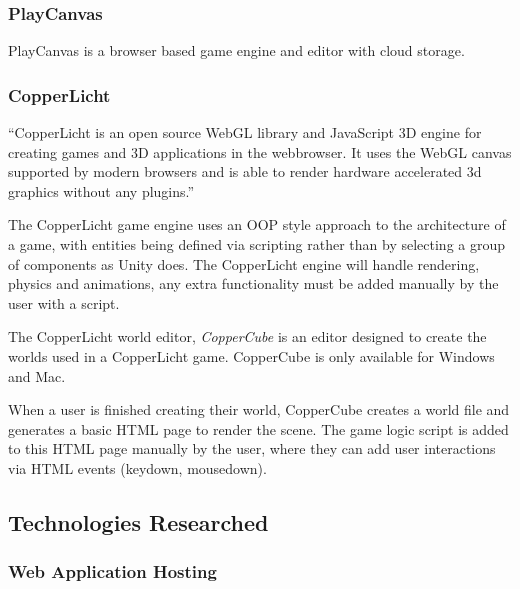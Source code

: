 \documentclass[a4paper, 12pt]{article}
\begin{document}

\subsubsection{PlayCanvas}
PlayCanvas is a browser based game engine and editor with cloud storage. 


\subsubsection{CopperLicht}
``CopperLicht is an open source WebGL library and JavaScript 3D engine for creating games and 3D applications in the webbrowser. It uses the WebGL canvas supported by modern browsers and is able to render hardware accelerated 3d graphics without any plugins.''


The CopperLicht game engine uses an OOP style approach to the architecture of a game, with entities being defined via scripting rather than by selecting a group of components as Unity does. The CopperLicht engine will handle rendering, physics and animations, any extra functionality must be added manually by the user with a script.


The CopperLicht world editor, \emph{CopperCube} is an editor designed to create the worlds used in a CopperLicht game. CopperCube is only available for Windows and Mac.


When a user is finished creating their world, CopperCube creates a world file and generates a basic HTML page to render the scene. The game logic script is added to this HTML page manually by the user, where they can add user interactions via HTML events (keydown, mousedown).


\subsection{Technologies Researched}
\subsubsection{Web Application Hosting}
\end{document}
